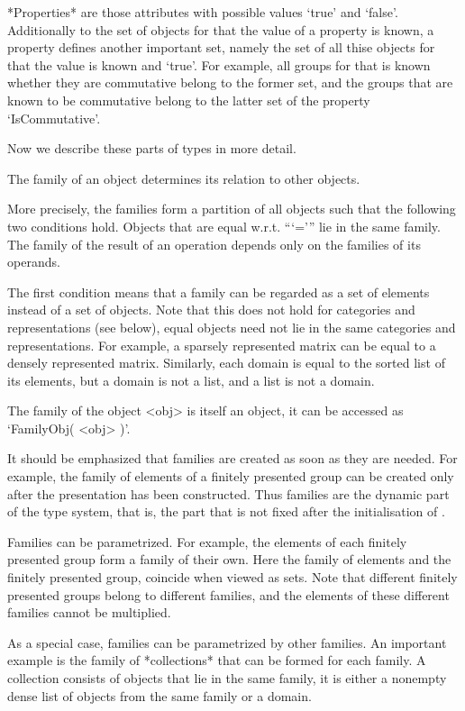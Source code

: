 *Properties* are those attributes with possible values `true' and
`false'.
Additionally to the set of objects for that the value of a property is
known, a property defines another important set,
namely the set of all thise objects for that the value is known and
`true'.
For example, all groups for that is known whether they are commutative
belong to the former set, and the groups that are known to be commutative
belong to the latter set of the property `IsCommutative'.

Now we describe these parts of types in more detail.


The family of an object determines its relation to other objects.

More precisely, the families form a partition of all {\GAP} objects
such that the following two conditions hold.
Objects that are equal w.r.t. ```=''' lie in the same family.
The family of the result of an operation depends only on the families
of its operands.

The first condition means that a family can be regarded as a set of
elements instead of a set of objects.
Note that this does not hold for categories and representations
(see below),
equal objects need not lie in the same categories and representations.
For example, a sparsely represented matrix can be equal to a densely
represented matrix.
Similarly, each domain is equal to the sorted list of its elements,
but a domain is not a list, and a list is not a domain.

The family of the object <obj> is itself an object,
it can be accessed as `FamilyObj( <obj> )'.

It should be emphasized that families are created as soon as they are
needed.
For example, the family of elements of a finitely presented group
can be created only after the presentation has been constructed.
Thus families are the dynamic part of the type system,
that is, the part that is not fixed after the initialisation of {\GAP}.

Families can be parametrized.
For example, the elements of each finitely presented group form a family
of their own.
Here the family of elements and the finitely presented group,
coincide when viewed as sets.
Note that different finitely presented groups belong to different
families, and the elements of these different families cannot be
multiplied.

As a special case, families can be parametrized by other families.
An important example is the family of *collections* that can be formed
for each family.
A collection consists of objects that lie in the same family,
it is either a nonempty dense list of objects from the same family
or a domain.

